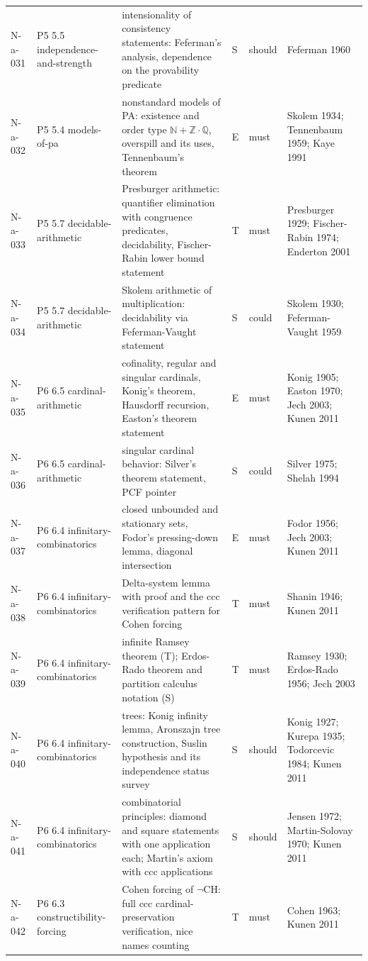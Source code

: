 \begin{longtable}{@{}p{0.52in}p{0.85in}p{2.5in}p{0.22in}p{0.42in}p{1.95in}@{}}
N-a-031 & P5 5.5 independence-and-strength & intensionality of consistency statements: Feferman's analysis, dependence on the provability predicate & S & should & Feferman 1960 \\
N-a-032 & P5 5.4 models-of-pa & nonstandard models of PA: existence and order type \(\mathbb N+\mathbb Z\cdot\mathbb Q\), overspill and its uses, Tennenbaum's theorem & E & must & Skolem 1934; Tennenbaum 1959; Kaye 1991 \\
N-a-033 & P5 5.7 decidable-arithmetic & Presburger arithmetic: quantifier elimination with congruence predicates, decidability, Fischer-Rabin lower bound statement & T & must & Presburger 1929; Fischer-Rabin 1974; Enderton 2001 \\
N-a-034 & P5 5.7 decidable-arithmetic & Skolem arithmetic of multiplication: decidability via Feferman-Vaught statement & S & could & Skolem 1930; Feferman-Vaught 1959 \\
N-a-035 & P6 6.5 cardinal-arithmetic & cofinality, regular and singular cardinals, Konig's theorem, Hausdorff recursion, Easton's theorem statement & E & must & Konig 1905; Easton 1970; Jech 2003; Kunen 2011 \\
N-a-036 & P6 6.5 cardinal-arithmetic & singular cardinal behavior: Silver's theorem statement, PCF pointer & S & could & Silver 1975; Shelah 1994 \\
N-a-037 & P6 6.4 infinitary-combinatorics & closed unbounded and stationary sets, Fodor's pressing-down lemma, diagonal intersection & E & must & Fodor 1956; Jech 2003; Kunen 2011 \\
N-a-038 & P6 6.4 infinitary-combinatorics & Delta-system lemma with proof and the ccc verification pattern for Cohen forcing & T & must & Shanin 1946; Kunen 2011 \\
N-a-039 & P6 6.4 infinitary-combinatorics & infinite Ramsey theorem (T); Erdos-Rado theorem and partition calculus notation (S) & T & must & Ramsey 1930; Erdos-Rado 1956; Jech 2003 \\
N-a-040 & P6 6.4 infinitary-combinatorics & trees: Konig infinity lemma, Aronszajn tree construction, Suslin hypothesis and its independence status survey & S & should & Konig 1927; Kurepa 1935; Todorcevic 1984; Kunen 2011 \\
N-a-041 & P6 6.4 infinitary-combinatorics & combinatorial principles: diamond and square statements with one application each; Martin's axiom with ccc applications & S & should & Jensen 1972; Martin-Solovay 1970; Kunen 2011 \\
N-a-042 & P6 6.3 constructibility-forcing & Cohen forcing of \(\neg\mathrm{CH}\): full ccc cardinal-preservation verification, nice names counting & T & must & Cohen 1963; Kunen 2011 \\

\end{longtable}

